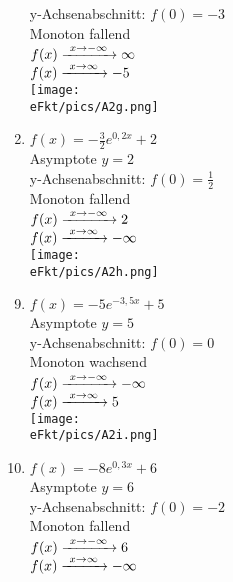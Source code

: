 \begin{Answer}[ref=eFktA2]
\begin{minipage}{\textwidth}
\begin{minipage}[t]{0.49\textwidth}
\begin{enumerate}[label=\alph*)]
				y-Achsenabschnitt: \(f(0)=-3\)\\
				Monoton fallend\\
				\(f(x)\xrightarrow{\hphantom{\ }x\to-\infty\hphantom{\ }}\infty\)\\
				\(f(x)\xrightarrow{\hphantom{\ }x\to\infty\hphantom{\ }}-5\)\\
				\texttt{[image: \\eFkt/pics/A2g.png]}
				\item \(f(x)=-\frac{3}{2}e^{0,2x}+2\)\\
				Asymptote \(y=2\)\\
				y-Achsenabschnitt: \(f(0)=\frac{1}{2}\)\\
				Monoton fallend\\
				\(f(x)\xrightarrow{\hphantom{\ }x\to-\infty\hphantom{\ }}2\)\\
				\(f(x)\xrightarrow{\hphantom{\ }x\to\infty\hphantom{\ }}-\infty\)\\
				\texttt{[image: \\eFkt/pics/A2h.png]}
			\end{enumerate}
		\end{minipage}
	\end{minipage}
	\newpage
	\begin{minipage}{\textwidth}
		\begin{minipage}[t]{0.49\textwidth}
			\begin{enumerate}[label=\alph*)]
				\setcounter{enumi}{8}
				\item \(f(x)=-5e^{-3,5x}+5\)\\
				Asymptote \(y=5\)\\
				y-Achsenabschnitt: \(f(0)=0\)\\
				Monoton wachsend\\
				\(f(x)\xrightarrow{\hphantom{\ }x\to-\infty\hphantom{\ }}-\infty\)\\
				\(f(x)\xrightarrow{\hphantom{\ }x\to\infty\hphantom{\ }}5\)\\
				\texttt{[image: \\eFkt/pics/A2i.png]}
				\item \(f(x)=-8e^{0,3x}+6\)\\
				Asymptote \(y=6\)\\
				y-Achsenabschnitt: \(f(0)=-2\)\\
				Monoton fallend\\
				\(f(x)\xrightarrow{\hphantom{\ }x\to-\infty\hphantom{\ }}6\)\\
				\(f(x)\xrightarrow{\hphantom{\ }x\to\infty\hphantom{\ }}-\infty\)\\

\end{enumerate}
\end{minipage}
\end{minipage}
\end{Answer}
